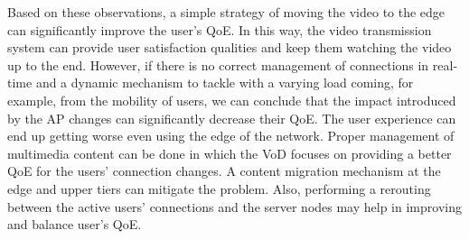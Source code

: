 Based on these observations,
a simple strategy of moving the video to the edge can significantly improve the user's QoE. In this way, the video transmission system can provide user satisfaction qualities and keep them watching the video up to the end. However, if there is no correct management of connections in real-time and a dynamic mechanism to tackle with a varying load coming, for example, from the mobility of users, we can conclude that the impact introduced by the AP changes can significantly decrease their QoE. The user experience can end up getting worse even using the edge of the network. Proper management of multimedia content can be done in which the VoD focuses on providing a better QoE for the users' connection changes. A content migration mechanism at the edge and upper tiers can mitigate the problem. Also, performing a rerouting between the active users' connections and the server nodes may help in improving and balance user's QoE.

